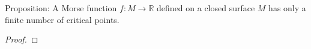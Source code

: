 \documentclass[12pt]{article}
\newcommand{\bR}{{\mathbb R}}
\begin{document}
\graphicspath{ {images/} }
\pagestyle{empty}

\smallskip \noindent
Proposition: A Morse function $f:M\rightarrow \bR$ defined on a closed surface $M$ has only a finite number of critical points.

\begin{proof}
      

      


\end{proof}
\end{document}
